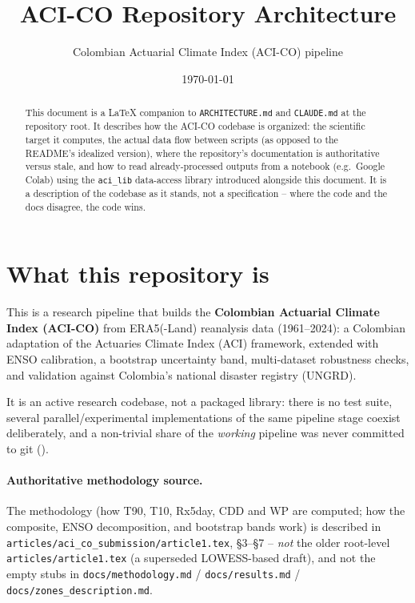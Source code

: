 \documentclass[11pt]{article}
\title{\textbf{ACI-CO Repository Architecture}}
\author{Colombian Actuarial Climate Index (ACI-CO) pipeline}
\date{\today}
\begin{document}
\sloppy
\maketitle

\begin{abstract}
This document is a LaTeX companion to \texttt{ARCHITECTURE.md} and
\texttt{CLAUDE.md} at the repository root. It describes how the ACI-CO
codebase is organized: the scientific target it computes, the actual data
flow between scripts (as opposed to the README's idealized version), where
the repository's documentation is authoritative versus stale, and how to
read already-processed outputs from a notebook (e.g.\ Google Colab) using
the \texttt{aci_lib} data-access library introduced alongside this document.
It is a description of the codebase as it stands, not a specification --
where the code and the docs disagree, the code wins.
\end{abstract}

\tableofcontents

\section{What this repository is}

This is a research pipeline that builds the \textbf{Colombian Actuarial
Climate Index (ACI-CO)} from ERA5(-Land) reanalysis data (1961--2024): a
Colombian adaptation of the Actuaries Climate Index (ACI) framework,
extended with ENSO calibration, a bootstrap uncertainty band, multi-dataset
robustness checks, and validation against Colombia's national disaster
registry (UNGRD).

It is an active research codebase, not a packaged library: there is no test
suite, several parallel/experimental implementations of the same pipeline
stage coexist deliberately, and a non-trivial share of the \emph{working}
pipeline was never committed to git ().

\paragraph{Authoritative methodology source.} The methodology (how T90,
T10, Rx5day, CDD and WP are computed; how the composite, ENSO decomposition,
and bootstrap bands work) is described in
\texttt{articles/\allowbreak aci\_co\_submission/\allowbreak article1.tex}, \S3--\S7 -- \emph{not}
the older root-level \texttt{articles/article1.tex} (a superseded
LOWESS-based draft), and not the empty stubs in \texttt{docs/methodology.md}
/ \texttt{docs/results.md} / \texttt{docs/zones\_description.md}.
\end{document}
